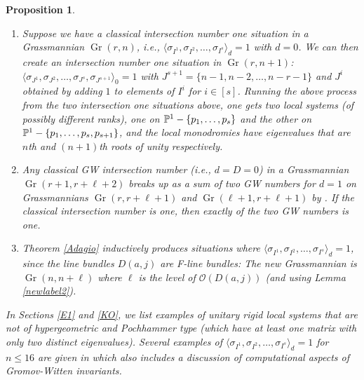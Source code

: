 \documentclass[11pt]{amsart}
\newcommand\Gr{\operatorname{Gr}}
\newtheorem{proposition}[theorem]{Proposition}
\numberwithin{theorem}{subsection}
\begin{document}
{\begin{proposition}
\begin{enumerate}
\item Suppose we have a classical intersection number one   situation in a Grassmannian $\Gr(r,n)$, i.e., $\langle\sigma_{I^1}, \sigma_{I^2},\dots,\sigma_{I^s}\rangle_d= 1$ with $d=0$. We can then create an intersection number one situation in $\Gr(r,n+1)$:   $\langle\sigma_{J^1}, \sigma_{J^2},\dots,\sigma_{J^s},\sigma_{J^{s+1}}\rangle_0= 1$ with $J^{s+1}=\{n-1,n-2,\dots,n-r-1\}$ and $J^i$ obtained by adding $1$ to elements of $I^i$ for $i\in[s]$.  Running the above process from the two intersection one situations above, one gets two local systems (of possibly different ranks), one on $\Bbb{P}^1-\{p_1,\dots,p_s\}$ and the other on $\Bbb{P}^1-\{p_1,\dots,p_s,p_{s+1}\}$, and the local monodromies have eigenvalues that are $n$th and $(n+1)$th roots of unity respectively.
\item Any classical GW intersection number (i.e., $d=D=0$) in a Grassmannian $\Gr(r+1,r+\ell+2)$ breaks up as a sum of two GW numbers for $d=1$ on Grassmannians $\Gr(r,r+\ell+1)$ and $\Gr(\ell+1,r+\ell+1)$ by \cite[Section 9.9]{BGM}. If the classical intersection number is one, then exactly of the two GW numbers is one.
\item Theorem \ref{Adagio} inductively produces situations where $\langle\sigma_{I^1}, \sigma_{I^2},\dots,\sigma_{I^s}\rangle_d= 1$, since the line bundles $D(a,j)$ are F-line bundles: The new Grassmannian
is $\Gr(n,n+\ell)$ where $\ell$ is the level of $\mathcal{O}(D(a,j))$ (and using Lemma \ref{newlabel2}).
\end{enumerate}
In Sections \ref{E1} and \ref{KO}, we list examples of unitary rigid local systems that are not of hypergeometric and Pochhammer type (which have at least one  matrix with only two distinct eigenvalues). Several examples of $\langle\sigma_{I^1}, \sigma_{I^2},\dots,\sigma_{I^s}\rangle_d= 1$ for $n\leq 16$ are given in \cite{OO} which also includes a discussion of computational aspects of Gromov-Witten invariants.

\end{proposition}}
\end{document}
